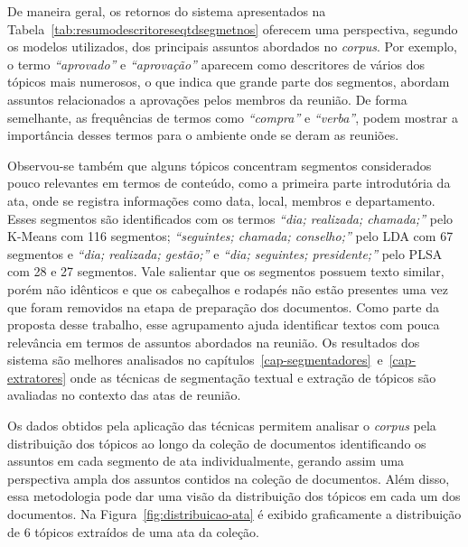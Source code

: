 
\begin{landscape}%

\end{landscape}




De maneira geral, os retornos do sistema apresentados na Tabela~\ref{tab:resumodescritoreseqtdsegmetnos} oferecem uma perspectiva, segundo os modelos utilizados, dos principais assuntos abordados no \textit{corpus}. Por exemplo, o termo \textit{``aprovado''} e \textit{``aprovação''} aparecem como descritores de vários dos tópicos mais numerosos, o que indica que grande parte dos segmentos, abordam assuntos relacionados a aprovações pelos membros da reunião. De forma semelhante, as frequências de termos como \textit{``compra''} e \textit{``verba''}, podem mostrar a importância desses termos para o ambiente onde se deram as reuniões.


Observou-se também que alguns tópicos concentram segmentos considerados pouco relevantes em termos de conteúdo, como a primeira parte introdutória da ata, onde se registra informações como data, local, membros e departamento. Esses segmentos são identificados com os termos 
\textit{``dia; realizada; chamada;''} pelo K-Means com 116 segmentos; 
\textit{``seguintes; chamada; conselho;''} pelo LDA com 67 segmentos e 
\textit{``dia; realizada; gestão;''} e \textit{``dia; seguintes; presidente;''} pelo PLSA com 28 e 27 segmentos. Vale salientar que os segmentos possuem texto similar, porém não idênticos e que os cabeçalhos e rodapés não estão presentes uma vez que foram removidos na etapa de preparação dos documentos. Como parte da proposta desse trabalho, esse agrupamento ajuda identificar textos com pouca relevância em termos de assuntos abordados na reunião.
Os resultados dos sistema são melhores analisados no capítulos~\ref{cap-segmentadores}~e~\ref{cap-extratores} onde as técnicas de segmentação textual e extração de tópicos são avaliadas no contexto das atas de reunião.


Os dados obtidos pela aplicação das técnicas permitem analisar o \textit{corpus} pela distribuição dos tópicos ao longo da coleção de documentos identificando os assuntos em cada segmento de ata individualmente, gerando assim uma perspectiva ampla dos assuntos contidos na coleção de documentos. Além disso, essa metodologia pode dar uma visão da distribuição dos tópicos em cada um dos documentos. Na Figura~\ref{fig:distribuicao-ata} é exibido graficamente a distribuição de 6 tópicos extraídos de uma ata da coleção. 


